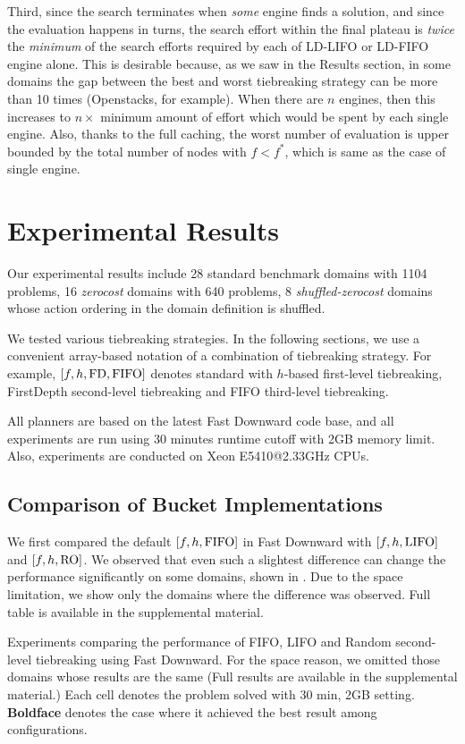 Third, since the search terminates when \emph{some} engine finds a
solution, and since the evaluation happens in turns, the search effort
within the final plateau is \emph{twice} the \emph{minimum} of the
search efforts required by each of LD-LIFO or LD-FIFO engine alone. This
is desirable because, as we saw in the Results section, in some domains the
gap between the best and worst tiebreaking strategy can be more than 10
times (Openstacks, for example).  When there are $n$ engines, then this
increases to $n\times$ minimum amount of effort which would be spent by
each single engine.
Also, thanks to the full caching, the worst number of evaluation is
upper bounded by the total number of nodes with $f<f^*$, which is same
as the case of single engine.

\section{Experimental Results}

Our experimental results include 28 standard benchmark domains with
1104 problems, 16 \emph{zerocost} domains with 640 problems, 8 \emph{shuffled-zerocost} 
domains whose action ordering in the domain definition is shuffled.

We tested various tiebreaking strategies. In the following sections, we
use a convenient array-based notation of a combination of tiebreaking
strategy.  For example, $[f,h,\mbox{FD},\mbox{FIFO}]$ denotes standard \astar with
$h$-based first-level tiebreaking, FirstDepth second-level tiebreaking and FIFO
third-level tiebreaking.

All planners are based on the latest Fast Downward code base, and all
experiments are run using 30 minutes runtime cutoff with 2GB memory
limit. Also, experiments are conducted on Xeon E5410@2.33GHz CPUs.

\subsection{Comparison of Bucket Implementations}

We first compared the default $[f,h,\mbox{FIFO}]$ in Fast Downward with
$[f,h,\mbox{LIFO}]$ and $[f,h,\mbox{RO}]$.  We observed that even such a slightest
difference can change the performance significantly on some domains,
shown in . Due to the space limitation, we show
only the domains where the difference was observed. Full table is
available in the supplemental material.

\begin{table}[htbp]
 \centering {} 
  \caption{Experiments
 comparing the performance of FIFO, LIFO and Random second-level
 tiebreaking using Fast Downward. For the space reason, we omitted those
 domains whose results are the same (Full results are available in the
 supplemental material.) Each cell denotes the problem solved with 30
 min, 2GB setting. \textbf{Boldface} denotes the case where it achieved
 the best result among configurations.}  \label{single-coverage}
\end{table}

